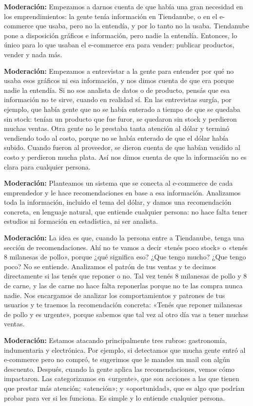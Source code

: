 \noindent\textbf{Moderación:} Empezamos a darnos cuenta de que había una gran necesidad en los emprendimientos: la gente tenía información en Tiendanube, o en el e-commerce que usaba, pero no la entendía, y por lo tanto no la usaba. Tiendanube pone a disposición gráficos e información, pero nadie la entendía. Entonces, lo único para lo que usaban el e-commerce era para vender: publicar productos, vender y nada más.

\noindent\textbf{Moderación:} Empezamos a entrevistar a la gente para entender por qué no usaba esos gráficos ni esa información, y nos dimos cuenta de que era porque nadie la entendía. Si no sos analista de datos o de producto, pensás que esa información no te sirve, cuando en realidad sí. En las entrevistas surgía, por ejemplo, que había gente que no se había enterado a tiempo de que se quedaba sin stock: tenían un producto que fue furor, se quedaron sin stock y perdieron muchas ventas. Otra gente no le prestaba tanta atención al dólar y terminó vendiendo todo al costo, porque no se había enterado de que el dólar había subido. Cuando fueron al proveedor, se dieron cuenta de que habían vendido al costo y perdieron mucha plata. Así nos dimos cuenta de que la información no es clara para cualquier persona.

\noindent\textbf{Moderación:} Planteamos un sistema que se conecta al e-commerce de cada emprendedor y le hace recomendaciones en base a esa información. Analizamos toda la información, incluido el tema del dólar, y damos una recomendación concreta, en lenguaje natural, que entiende cualquier persona: no hace falta tener estudios ni formación en estadística, ni ser analista.

\noindent\textbf{Moderación:} La idea es que, cuando la persona entre a Tiendanube, tenga una sección de recomendaciones. Ahí no te vamos a decir «tenés poco stock» o «tenés 8 milanesas de pollo», porque ¿qué significa eso? ¿Que tengo mucho? ¿Que tengo poco? No se entiende. Analizamos el patrón de tus ventas y te decimos directamente si las tenés que reponer o no. Tal vez tenés 8 milanesas de pollo y 8 de carne, y las de carne no hace falta reponerlas porque no te las compra nunca nadie. Nos encargamos de analizar los comportamientos y patrones de tus usuarios y te traemos la recomendación concreta: «Tenés que reponer milanesas de pollo y es urgente», porque sabemos que tal vez al otro día vas a tener muchas ventas.

\noindent\textbf{Moderación:} Estamos atacando principalmente tres rubros: gastronomía, indumentaria y electrónica. Por ejemplo, si detectamos que mucha gente entró al e-commerce pero no compró, te sugerimos que le mandes un mail con algún descuento. Después, cuando la gente aplica las recomendaciones, vemos cómo impactaron. Las categorizamos en «urgente», que son acciones a las que tienen que prestar más atención; «atención»; y «oportunidad», que es algo que podrían probar para ver si les funciona. Es simple y lo entiende cualquier persona.

